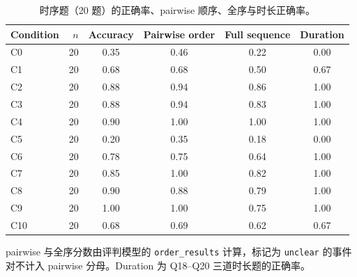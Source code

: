 \begin{table}[H]
\centering
\caption{时序题（20 题）的正确率、pairwise 顺序、全序与时长正确率。}
\label{tab:temporal}
\small
\begin{threeparttable}
\begin{tabular}{@{}l r c c c c@{}}
\toprule
Condition & $n$ & Accuracy & Pairwise order & Full sequence & Duration \\
\midrule
C0 & 20 & 0.35 & 0.46 & 0.22 & 0.00 \\
C1 & 20 & 0.68 & 0.68 & 0.50 & 0.67 \\
C2 & 20 & 0.88 & 0.94 & 0.86 & 1.00 \\
C3 & 20 & 0.88 & 0.94 & 0.83 & 1.00 \\
C4 & 20 & 0.90 & 1.00 & 1.00 & 1.00 \\
C5 & 20 & 0.20 & 0.35 & 0.18 & 0.00 \\
C6 & 20 & 0.78 & 0.75 & 0.64 & 1.00 \\
C7 & 20 & 0.85 & 1.00 & 0.82 & 1.00 \\
C8 & 20 & 0.90 & 0.88 & 0.79 & 1.00 \\
C9 & 20 & 1.00 & 1.00 & 0.75 & 1.00 \\
C10 & 20 & 0.68 & 0.69 & 0.62 & 0.67 \\
\bottomrule
\end{tabular}
\begin{tablenotes}\scriptsize
\item pairwise 与全序分数由评判模型的 \texttt{order\_results} 计算，标记为 \texttt{unclear} 的事件对不计入 pairwise 分母。Duration 为 Q18--Q20 三道时长题的正确率。
\end{tablenotes}
\end{threeparttable}
\end{table}
